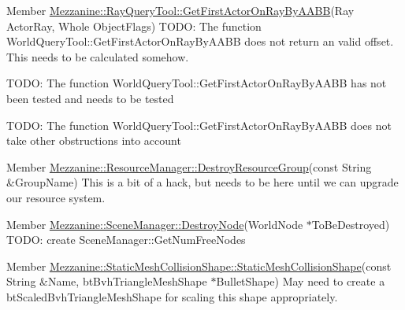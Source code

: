 \label{todo__todo000021}
\hypertarget{todo__todo000021}{}
 
\begin{DoxyDescription}
\item[Member \hyperlink{classMezzanine_1_1RayQueryTool_a9ded1647755a523d3dbda297a0e73eba}{Mezzanine::RayQueryTool::GetFirstActorOnRayByAABB}(Ray ActorRay, Whole ObjectFlags) ]TODO: The function WorldQueryTool::GetFirstActorOnRayByAABB does not return an valid offset. This needs to be calculated somehow. 

TODO: The function WorldQueryTool::GetFirstActorOnRayByAABB has not been tested and needs to be tested 

TODO: The function WorldQueryTool::GetFirstActorOnRayByAABB does not take other obstructions into account 
\end{DoxyDescription}

\label{todo__todo000024}
\hypertarget{todo__todo000024}{}
 
\begin{DoxyDescription}
\item[Member \hyperlink{classMezzanine_1_1ResourceManager_aa827efdad18698b7d7319dab35864bbe}{Mezzanine::ResourceManager::DestroyResourceGroup}(const String \&GroupName) ]This is a bit of a hack, but needs to be here until we can upgrade our resource system. 
\end{DoxyDescription}

\label{todo__todo000025}
\hypertarget{todo__todo000025}{}
 
\begin{DoxyDescription}
\item[Member \hyperlink{classMezzanine_1_1SceneManager_ab6123477f052d34a357db85a8284c8be}{Mezzanine::SceneManager::DestroyNode}(WorldNode $\ast$ToBeDestroyed) ]TODO: create SceneManager::GetNumFreeNodes 
\end{DoxyDescription}

\label{todo__todo000004}
\hypertarget{todo__todo000004}{}
 
\begin{DoxyDescription}
\item[Member \hyperlink{classMezzanine_1_1StaticMeshCollisionShape_a1c565cc4d62ab7a0cd5cf55254905f05}{Mezzanine::StaticMeshCollisionShape::StaticMeshCollisionShape}(const String \&Name, btBvhTriangleMeshShape $\ast$BulletShape) ]May need to create a btScaledBvhTriangleMeshShape for scaling this shape appropriately. 
\end{DoxyDescription}

